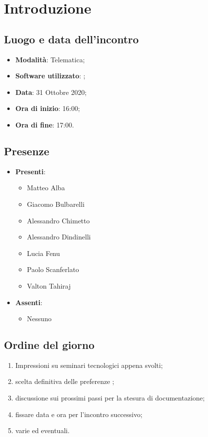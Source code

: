 \documentclass[]{article}
\begin{document}
	

	\newpage


	\section{Introduzione}
		\subsection{Luogo e data dell'incontro}
		\begin{itemize}
			\item \textbf{Modalità}: Telematica;
			\item \textbf{Software utilizzato}: ;
			\item \textbf{Data}: 31 Ottobre 2020;
			\item \textbf{Ora di inizio}: 16:00;
			\item \textbf{Ora di fine}: 17:00.
		\end{itemize}

		\subsection{Presenze}
		\begin{itemize}
			\item \textbf{Presenti}:
			\begin{itemize}
				\item Matteo Alba
				\item Giacomo Bulbarelli
				\item Alessandro Chimetto
				\item Alessandro Dindinelli
				\item Lucia Fenu
				\item Paolo Scanferlato
				\item Valton Tahiraj 
			\end{itemize}
			\item \textbf{Assenti}:
			\begin{itemize}
				\item Nessuno
			\end{itemize}
		\end{itemize}


		\subsection{Ordine del giorno}
		\begin{enumerate}
			\item Impressioni su seminari tecnologici appena svolti;
			\item scelta definitiva delle preferenze ;
			\item discussione sui prossimi passi per la stesura di documentazione;
			\item fissare data e ora per l'incontro successivo;
			\item varie ed eventuali.
		\end{enumerate}
\end{document}
